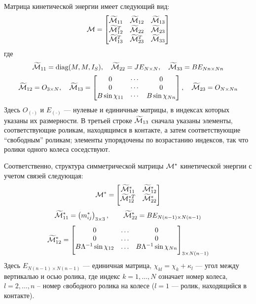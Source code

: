 Матрица кинетической энергии имеет следующий вид:
$$
\mathcal{M} = \begin{bmatrix}
    \widetilde{\mathcal{M}}_{11}   & \widetilde{\mathcal{M}}_{12}   & \widetilde{\mathcal{M}}_{13} \\
    \widetilde{\mathcal{M}}_{12}^T & \widetilde{\mathcal{M}}_{22}   & \widetilde{\mathcal{M}}_{23} \\
    \widetilde{\mathcal{M}}_{13}^T & \widetilde{\mathcal{M}}_{23}^T & \widetilde{\mathcal{M}}_{33} \\
\end{bmatrix}
$$
где
$$
\widetilde{\mathcal{M}}_{11} = \text{diag}(M, M, I_S),
\quad
\widetilde{\mathcal{M}}_{22} = JE_{N \times N},
\quad
\widetilde{\mathcal{M}}_{33} = BE_{Nn \times Nn}
$$
$$
\widetilde{\M}_{12} = O_{3 \times N},
\quad
\widetilde{\M}_{13} = \begin{bmatrix}
        0                      & \cdots & 0                      \\
        0                      & \cdots & 0                      \\
        B\sin\chi_{11}         & \cdots & B\sin\chi_{Nn}         \\
    \end{bmatrix},
\quad
\widetilde{\M}_{23} = O_{N \times Nn}
\vsp
$$
Здесь $O_{(\boldsymbol{\cdot})}$ и $E_{(\boldsymbol{\cdot})}$ --- нулевые и единичные матрицы, в индексах которых указаны их размерности. В третьей строке $\widetilde{\mathcal{M}}_{13}$ сначала указаны элементы, соответствующие роликам, находящимся в контакте, а затем соответствующие ``свободным'' роликам; элементы упорядочены по возрастанию индексов, так что ролики одного колеса соседствуют.

Соответственно, структура симметрической матрицы $\mathcal{M}^*$ кинетической энергии с учетом связей следующая:
$$
\M^* = 
    \begin{bmatrix}
        \widetilde{\M}^*_{11} & \widetilde{\M}^*_{12} \\
        \widetilde{\M}^{*T}_{12} & \widetilde{\M}^*_{22} \\[4pt]
    \end{bmatrix}
\vsp
$$
$$
\widetilde{\M}^*_{11} = 
    \left(
        m^*_{ij}
    \right)_{3\times3},
\qquad
\widetilde{\M}^*_{22} = 
    BE_{N(n-1) \times N(n-1)}
\vsp
$$
$$
\widetilde{\M}^*_{12} = 
    \begin{bmatrix}
        0&\ldots& 0 \\
        0&\ldots&0 \\
        B\Lambda^{-1}\sin\chi_{12}&\ldots& B\Lambda^{-1}\sin\chi_{Nn}\\[4pt]
    \end{bmatrix}_{3\times N(n-1)}
\vsp
$$
Здесь $E_{N(n-1) \times N(n-1)}$ --- единичная матрица, $\chi_{kl} = \chi_k+\kappa_l$ --- угол между вертикалью и осью ролика, где индекс $k = 1,\dots,N$ означает номер колеса, $l = 2,\ldots, n$ -- номер cвободного ролика на колесе ($l = 1$ --- ролик, находящийся в контакте).

